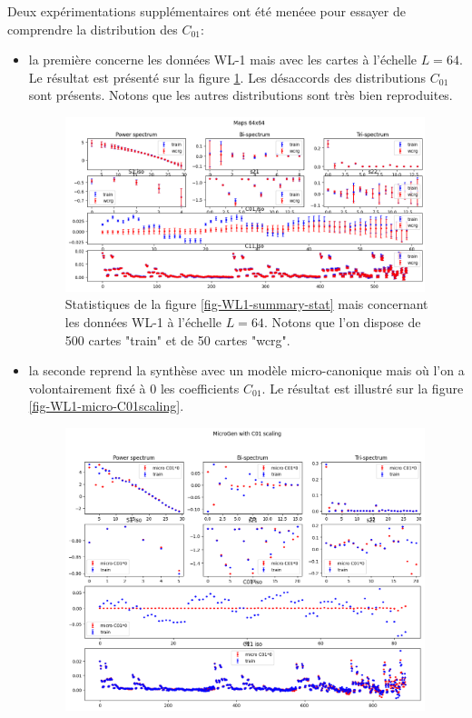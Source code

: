 \documentclass[12pt,twoside]{article}
\newcommand{\itemb}{\item[$\bullet$]}
\begin{document}
Deux expérimentations supplémentaires ont été menéee pour essayer de comprendre la distribution des $C_{01}$:
\begin{itemize}
\itemb la première concerne les données WL-1 mais avec les cartes à l'échelle $L=64$. Le résultat est présenté sur la figure \ref{fig-WL1-64x64-summary-stat}. Les désaccords des distributions $C_{01}$ sont présents. Notons que les autres distributions sont très bien reproduites. 
\begin{figure}
\centering
\includegraphics[width=0.99\textwidth]{fig-WL1-64x64-summary-stat.png}
\caption{Statistiques de la figure \ref{fig-WL1-summary-stat} mais concernant les données WL-1 à l'échelle $L=64$. Notons que l'on dispose de 500 cartes "train" et de 50 cartes "wcrg".}
\label{fig-WL1-64x64-summary-stat}
\end{figure}
\itemb la seconde reprend la synthèse avec un modèle micro-canonique mais où l'on a volontairement fixé à 0 les coefficients $C_{01}$. Le résultat est illustré sur la figure \ref{fig-WL1-micro-C01scaling}.
\begin{figure}
\centering
\includegraphics[width=0.99\textwidth]{fig-WL1-micro-C01scaling.png}

\end{figure}
\end{itemize}
\end{document}
